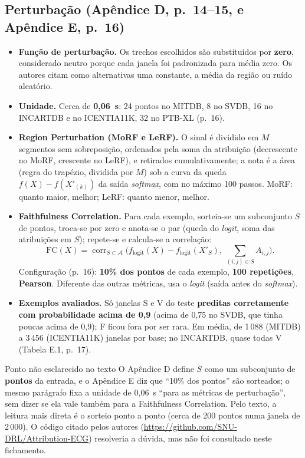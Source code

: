\documentclass[11pt,a4paper]{article}
\begin{document}
\subsection{Perturbação (Apêndice D, p.~14--15, e Apêndice E, p.~16)}
\begin{itemize}
\item \textbf{Função de perturbação.} Os trechos escolhidos são substituídos por \textbf{zero}, considerado neutro porque cada janela foi padronizada para média zero. Os autores citam como alternativas uma constante, a média da região ou ruído aleatório.
\item \textbf{Unidade.} Cerca de \textbf{0,06~s}: 24 pontos no MITDB, 8 no SVDB, 16 no INCARTDB e no ICENTIA11K, 32 no PTB-XL (p.~16).
\item \textbf{Region Perturbation (MoRF e LeRF).} O sinal é dividido em $M$ segmentos sem sobreposição, ordenados pela soma da atribuição (decrescente no MoRF, crescente no LeRF), e retirados cumulativamente; a nota é a área (regra do trapézio, dividida por $M$) sob a curva da queda $f(X)-f(X'_{(k)})$ da saída \textit{softmax}, com no máximo 100 passos. MoRF: quanto maior, melhor; LeRF: quanto menor, melhor.
\item \textbf{Faithfulness Correlation.} Para cada exemplo, sorteia-se um subconjunto $S$ de pontos, troca-se por zero e anota-se o par (queda do \textit{logit}, soma das atribuições em $S$); repete-se e calcula-se a correlação:
\[ \text{FC}(X) = \operatorname{corr}_{S\subset\mathcal{A}}\Big(f_{\text{logit}}(X)-f_{\text{logit}}(X'_S),\ \sum_{(i,j)\in S}A_{i,j}\Big). \]
Configuração (p.~16): \textbf{10\% dos pontos} de cada exemplo, \textbf{100 repetições}, \textbf{Pearson}. Diferente das outras métricas, usa o \textit{logit} (saída antes do \textit{softmax}).
\item \textbf{Exemplos avaliados.} Só janelas S e V do teste \textbf{preditas corretamente com probabilidade acima de 0,9} (acima de 0,75 no SVDB, que tinha poucas acima de 0,9); F ficou fora por ser rara. Em média, de 1\,088 (MITDB) a 3\,456 (ICENTIA11K) janelas por base; no INCARTDB, quase todas V (Tabela E.1, p.~17).
\end{itemize}

\begin{infobox}[warn]{Ponto não esclarecido no texto}
O Apêndice D define $S$ como um subconjunto de \textbf{pontos} da entrada, e o Apêndice E diz que “10\% dos pontos” são sorteados; o mesmo parágrafo fixa a unidade de 0,06~s “para as métricas de perturbação”, sem dizer se ela vale também para a Faithfulness Correlation. Pelo texto, a leitura mais direta é o sorteio ponto a ponto (cerca de 200 pontos numa janela de 2\,000). O código citado pelos autores (\url{https://github.com/SNU-DRL/Attribution-ECG}) resolveria a dúvida, mas não foi consultado neste fichamento.
\end{infobox}
\end{document}
